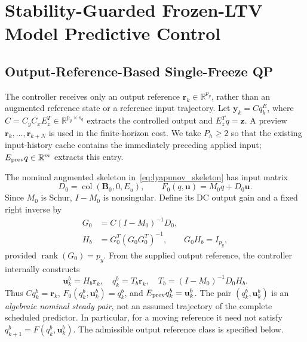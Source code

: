 \documentclass[journal]{IEEEtran}
\theoremstyle{plain}
\theoremstyle{definition}
\newcommand{\vy}{\mathbf{y}}
\newcommand{\vr}{\mathbf{r}}
\newcommand{\vu}{\mathbf{u}}
\newcommand{\vz}{\mathbf{z}}
\newcommand{\mB}{\mathbf{B}}
\newcommand{\R}{\mathbb{R}}
\newcommand{\col}{\operatorname{col}}
\begin{document}
\begingroup\color{blue}
\section{Stability-Guarded Frozen-LTV Model Predictive Control}
\label{sec:control}
\subsection{Output-Reference-Based Single-Freeze QP}
\label{subsec:frozen_mpc}
The controller receives only an output reference $\vr_k\in\R^{p_y}$, rather than an augmented reference state or a reference input trajectory. Let $\vy_k=Cq_k^E$, where
$C=C_yC_xE_z^T\in\R^{p_y\times s_q}$ extracts the controlled output and $E_z^Tq=\vz$. A preview $\vr_k,\ldots,\vr_{k+N}$ is used in the finite-horizon cost. We take $P_h\ge2$ so that the existing input-history cache contains the immediately preceding applied input; $E_{\rm prev}q\in\R^m$ extracts this entry.

The nominal augmented skeleton in~\eqref{eq:lyapunov_skeleton} has input matrix
\begin{equation}
D_0=\col(\mB_0,0,E_u),\qquad F_0(q,\vu)=M_0q+D_0\vu.
\label{eq:nominal_input_matrix}
\end{equation}
Since $M_0$ is Schur, $I-M_0$ is nonsingular. Define its DC output gain and a fixed right inverse by
\begin{equation}
\begin{aligned}
G_0&=C(I-M_0)^{-1}D_0,\\
H_b&=G_0^T(G_0G_0^T)^{-1},\qquad G_0H_b=I_{p_y},
\end{aligned}
\label{eq:reference_selector}
\end{equation}
provided $\operatorname{rank}(G_0)=p_y$. From the supplied output reference, the controller internally constructs
\begin{equation}
\vu_k^b=H_b\vr_k,\quad q_k^b=T_b\vr_k,\quad
T_b=(I-M_0)^{-1}D_0H_b.
\label{eq:reference_equilibrium}
\end{equation}
Thus $Cq_k^b=\vr_k$, $F_0(q_k^b,\vu_k^b)=q_k^b$, and $E_{\rm prev}q_k^b=\vu_k^b$. The pair $(q_k^b,\vu_k^b)$ is an \emph{algebraic nominal steady pair}, not an assumed trajectory of the complete scheduled predictor. In particular, for a moving reference it need not satisfy $q_{k+1}^b=F(q_k^b,\vu_k^b)$. The admissible output reference class is specified below.
\end{document}

